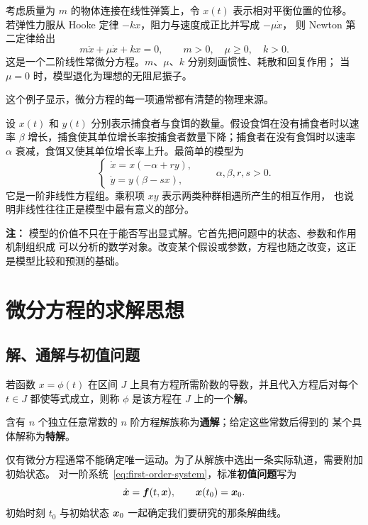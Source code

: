 \begin{example}
考虑质量为 $m$ 的物体连接在线性弹簧上，令 $x(t)$ 表示相对平衡位置的位移。
若弹性力服从 Hooke 定律 $-kx$，阻力与速度成正比并写成 $-\mu\dot{x}$，
则 Newton 第二定律给出
\begin{equation}\label{eq:damped-oscillator}
	m\ddot{x}+\mu\dot{x}+kx=0,
	\qquad m>0,\quad \mu\geq 0,\quad k>0.
\end{equation}
这是一个二阶线性常微分方程。$m$、$\mu$、$k$ 分别刻画惯性、耗散和回复作用；
当 $\mu=0$ 时，模型退化为理想的无阻尼振子。
\end{example}

这个例子显示，微分方程的每一项通常都有清楚的物理来源。

\begin{example}
设 $x(t)$ 和 $y(t)$ 分别表示捕食者与食饵的数量。假设食饵在没有捕食者时以速率
$\beta$ 增长，捕食使其单位增长率按捕食者数量下降；捕食者在没有食饵时以速率
$\alpha$ 衰减，食饵又使其单位增长率上升。最简单的模型为
\[
	\begin{cases}
		\dot{x}=x(-\alpha+ry),\\
		\dot{y}=y(\beta-sx),
	\end{cases}
	\qquad \alpha,\beta,r,s>0.
\]
它是一阶非线性方程组。乘积项 $xy$ 表示两类种群相遇所产生的相互作用，
也说明非线性往往正是模型中最有意义的部分。
\end{example}

\textbf{注：}
模型的价值不只在于能否写出显式解。它首先把问题中的状态、参数和作用机制组织成
可以分析的数学对象。改变某个假设或参数，方程也随之改变，这正是模型比较和预测的基础。


\section{微分方程的求解思想}

\subsection*{解、通解与初值问题}

\begin{definition}
若函数 $x=\phi(t)$ 在区间 $J$ 上具有方程所需阶数的导数，并且代入方程后对每个
$t\in J$ 都使等式成立，则称 $\phi$ 是该方程在 $J$ 上的一个\textbf{解}。

含有 $n$ 个独立任意常数的 $n$ 阶方程解族称为\textbf{通解}；给定这些常数后得到的
某个具体解称为\textbf{特解}。
\end{definition}

仅有微分方程通常不能确定唯一运动。为了从解族中选出一条实际轨道，需要附加初始状态。
对一阶系统~\eqref{eq:first-order-system}，标准\textbf{初值问题}写为
\begin{equation}\label{eq:ivp}
	\dot{\boldsymbol{x}}=\boldsymbol{f}(t,\boldsymbol{x}),
	\qquad \boldsymbol{x}(t_0)=\boldsymbol{x}_0.
\end{equation}
初始时刻 $t_0$ 与初始状态 $\boldsymbol{x}_0$ 一起确定我们要研究的那条解曲线。

